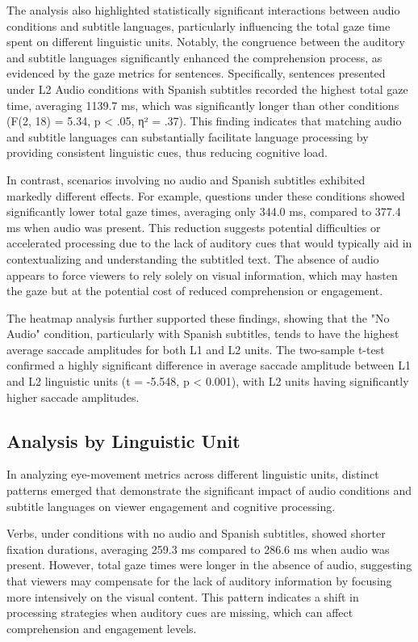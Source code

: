 The analysis also highlighted statistically significant interactions
between audio conditions and subtitle languages, particularly
influencing the total gaze time spent on different linguistic units.
Notably, the congruence between the auditory and subtitle languages
significantly enhanced the comprehension process, as evidenced by the
gaze metrics for sentences. Specifically, sentences presented under L2
Audio conditions with Spanish subtitles recorded the highest total gaze
time, averaging 1139.7 ms, which was significantly longer than other
conditions (F(2, 18) = 5.34, p \textless{} .05, η² = .37). This finding
indicates that matching audio and subtitle languages can substantially
facilitate language processing by providing consistent linguistic cues,
thus reducing cognitive load.

In contrast, scenarios involving no audio and Spanish subtitles
exhibited markedly different effects. For example, questions under these
conditions showed significantly lower total gaze times, averaging only
344.0 ms, compared to 377.4 ms when audio was present. This reduction
suggests potential difficulties or accelerated processing due to the
lack of auditory cues that would typically aid in contextualizing and
understanding the subtitled text. The absence of audio appears to force
viewers to rely solely on visual information, which may hasten the gaze
but at the potential cost of reduced comprehension or engagement.

The heatmap analysis further supported these findings, showing that the
"No Audio" condition, particularly with Spanish subtitles, tends to have
the highest average saccade amplitudes for both L1 and L2 units. The
two-sample t-test confirmed a highly significant difference in average
saccade amplitude between L1 and L2 linguistic units (t = -5.548, p
\textless{} 0.001), with L2 units having significantly higher saccade
amplitudes.

\subsection{Analysis by Linguistic Unit}\label{sub-sec-analysisbylinguisticunit}

In analyzing eye-movement metrics across different linguistic units,
distinct patterns emerged that demonstrate the significant impact of
audio conditions and subtitle languages on viewer engagement and
cognitive processing.

Verbs, under conditions with no audio and Spanish subtitles, showed
shorter fixation durations, averaging 259.3 ms compared to 286.6 ms when
audio was present. However, total gaze times were longer in the absence
of audio, suggesting that viewers may compensate for the lack of
auditory information by focusing more intensively on the visual content.
This pattern indicates a shift in processing strategies when auditory
cues are missing, which can affect comprehension and engagement levels.


